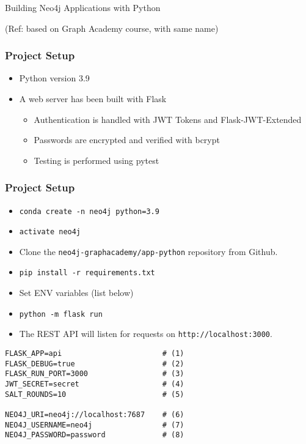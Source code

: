 \begin{frame}[fragile]\frametitle{}
\begin{center}
{\Large Building Neo4j Applications with Python}

{\tiny (Ref: based on Graph Academy course, with same name)}
\end{center}
\end{frame}

\begin{frame}\frametitle{Project Setup}
\begin{itemize}
\item Python version 3.9
\item A web server has been built with Flask
	\begin{itemize}
	\item Authentication is handled with JWT Tokens and Flask-JWT-Extended
	\item Passwords are encrypted and verified with bcrypt
	\item Testing is performed using pytest
	\end{itemize}
\end{itemize}

\end{frame}

\begin{frame}[fragile]\frametitle{Project Setup}
\begin{itemize}
\item \lstinline|conda create -n neo4j python=3.9|
\item \lstinline|activate neo4j|
\item  Clone  the \lstinline|neo4j-graphacademy/app-python| repository from Github.
\item \lstinline|pip install -r requirements.txt|
\item Set ENV variables (list below)
\item \lstinline|python -m flask run| 
\item The REST API will listen for requests on \lstinline|http://localhost:3000|.
\end{itemize}


\begin{lstlisting}
FLASK_APP=api                       # (1)
FLASK_DEBUG=true                    # (2)
FLASK_RUN_PORT=3000                 # (3)
JWT_SECRET=secret                   # (4)
SALT_ROUNDS=10                      # (5)

NEO4J_URI=neo4j://localhost:7687    # (6)
NEO4J_USERNAME=neo4j                # (7)
NEO4J_PASSWORD=password             # (8)
\end{lstlisting}

\end{frame}


